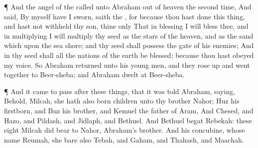{\par }{\PP {}¶ And the
angel of the
{}
called unto
Abraham out of
heaven the second
time,
And
said, By myself have I
sworn,
saith the
{}, for
because thou hast
done this
thing, and hast
not
withheld thy
son, thine
only
{}
That in
blessing I will
bless thee, and in
multiplying I will
multiply thy
seed as the
stars of the
heaven, and as the
sand which
{} upon the
sea
shore; and thy
seed shall
possess the
gate of his
enemies;
And in thy
seed shall all the
nations of the
earth be
blessed;
because thou hast
obeyed my
voice.
So
Abraham
returned unto his young
men, and they rose
up and
went
together to
Beer-sheba; and
Abraham
dwelt at
Beer-sheba.
\par }{\PP {}¶ And it came to pass
after these
things, that it was
told
Abraham,
saying, Behold,
Milcah, she hath also
born
children unto thy
brother
Nahor;
Huz his
firstborn, and
Buz his
brother, and
Kemuel the
father of
Aram,
And
Chesed, and
Hazo, and
Pildash, and
Jidlaph, and
Bethuel.
And
Bethuel
begat
Rebekah: these
eight
Milcah did
bear to
Nahor,
Abraham’s
brother.
And his
concubine, whose
name
{}
Reumah, she
bare also
Tebah, and
Gaham, and
Thahash, and
Maachah.

}
